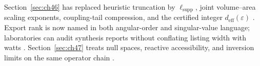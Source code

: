 
Section~\ref{sec:ch46} has replaced heuristic truncation by \(\ell_{\mathrm{supp}}\), joint volume--area scaling exponents, coupling-tail
compression, and the certified integer \(d_{\mathrm{eff}}(\varepsilon)\) \cite{stratton1941,hansen1988,harrington2001,devaney2004}. Export
rank is now named in both angular-order and singular-value language; laboratories can audit synthesis reports without conflating listing width
with watts \cite{hansen1988}. Section~\ref{sec:ch47} treats null spaces, reactive accessibility, and inversion limits on the same operator
chain \cite{stratton1941,harrington2001,devaney2004}.

